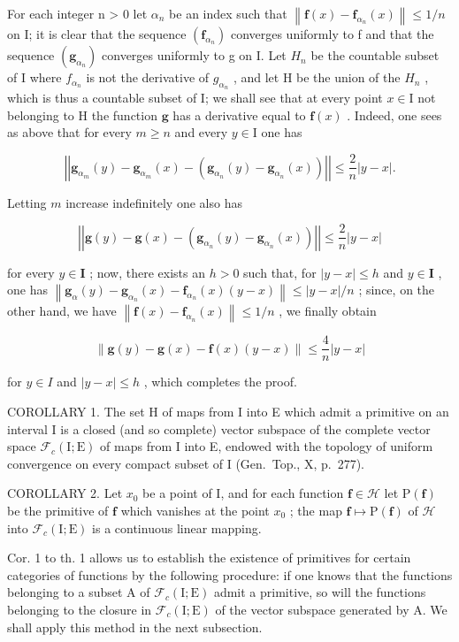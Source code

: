 For each integer n \textgreater{} 0 let \(\alpha_{n}\) be an index such that \(\left\|\mathbf{f}(x) - \mathbf{f}_{\alpha_{n}}(x)\right\| \leqslant 1/n\) on I; it is clear that the sequence \(\left(\mathbf{f}_{\alpha_{n}}\right)\) converges uniformly to f and that the sequence \(\left(\mathbf{g}_{\alpha_{n}}\right)\) converges uniformly to g on I. Let \(H_{n}\) be the countable subset of I where \(f_{\alpha_{n}}\) is not the derivative of \(g_{\alpha_{n}}\) , and let H be the union of the \(H_{n}\) , which is thus a countable subset of I; we shall see that at every point \(x \in \mathrm{I}\) not belonging to \(\mathrm{H}\) the function \(\mathbf{g}\) has a derivative equal to \(\mathbf{f}(x)\) . Indeed, one sees as above that for every \(m \geqslant n\) and every \(y \in \mathrm{I}\) one has

\[
\left| \left| \mathbf {g} _ {\alpha_ {m}} (y) - \mathbf {g} _ {\alpha_ {m}} (x) - \left(\mathbf {g} _ {\alpha_ {n}} (y) - \mathbf {g} _ {\alpha_ {n}} (x)\right) \right| \right| \leqslant \frac {2}{n} | y - x |.
\]

Letting \(m\) increase indefinitely one also has

\[
\left| \left| \mathbf {g} (y) - \mathbf {g} (x) - \left(\mathbf {g} _ {\alpha_ {n}} (y) - \mathbf {g} _ {\alpha_ {n}} (x)\right) \right| \right| \leqslant \frac {2}{n} | y - x |
\]

for every \(y \in \mathbf{I}\) ; now, there exists an \(h > 0\) such that, for \(|y - x| \leqslant h\) and \(y \in \mathbf{I}\) , one has \(\left\| \mathbf{g}_{\alpha}(y) - \mathbf{g}_{\alpha_n}(x) - \mathbf{f}_{\alpha_n}(x)(y - x) \right\| \leqslant |y - x| / n\) ; since, on the other hand, we have \(\left\| \mathbf{f}(x) - \mathbf{f}_{\alpha_n}(x) \right\| \leqslant 1 / n\) , we finally obtain

\[
\| \mathbf {g} (y) - \mathbf {g} (x) - \mathbf {f} (x) (y - x) \| \leqslant \frac {4}{n} | y - x |
\]

for \(y \in I\) and \(|y - x| \leqslant h\) , which completes the proof.

COROLLARY 1. The set H of maps from I into E which admit a primitive on an interval I is a closed (and so complete) vector subspace of the complete vector space \(\mathcal{F}_{c}(\mathrm{I};\mathrm{E})\) of maps from I into E, endowed with the topology of uniform convergence on every compact subset of I (Gen.~Top., X, p.~277).

COROLLARY 2. Let \(x_0\) be a point of I, and for each function \(\mathbf{f} \in \mathcal{H}\) let \(\mathrm{P}(\mathbf{f})\) be the primitive of \(\mathbf{f}\) which vanishes at the point \(x_0\) ; the map \(\mathbf{f} \mapsto \mathrm{P}(\mathbf{f})\) of \(\mathcal{H}\) into \(\mathcal{F}_c(\mathrm{I};\mathrm{E})\) is a continuous linear mapping.

Cor. 1 to th. 1 allows us to establish the existence of primitives for certain categories of functions by the following procedure: if one knows that the functions belonging to a subset A of \(\mathcal{F}_{c}(\mathrm{I};\mathrm{E})\) admit a primitive, so will the functions belonging to the closure in \(\mathcal{F}_{c}(\mathrm{I};\mathrm{E})\) of the vector subspace generated by A. We shall apply this method in the next subsection.

